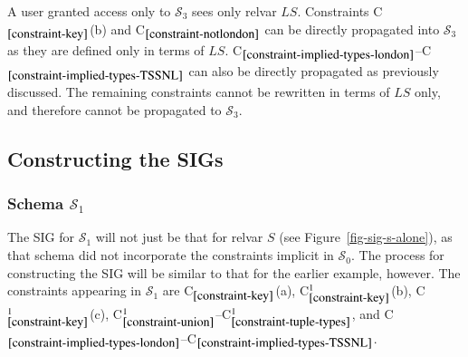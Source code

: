\documentclass{sig-alternate-05-2015}
\newcounter{constraint}
\newcommand{\LS}{\ensuremath{\mathit{LS}}}
\newcommand{\SC}[1]{\ensuremath{\mathcal{S}_{#1}}}
\begin{document}
\noindent A user granted access only to \(\SC{3}\) sees only relvar \(\LS\). Constraints C\(_{\ref{constraint-key}}\)(b) and C\(_{\ref{constraint-notlondon}}\) can be directly propagated into \(\SC{3}\) as they are defined only  in terms of \(\LS\). C\(_{\ref{constraint-implied-types-london}}\)--C\(_{\ref{constraint-implied-types-TSSNL}}\) can also be directly propagated as previously discussed. The remaining constraints cannot be rewritten in terms of \(\LS\) only, and therefore cannot be propagated to \(\SC{3}\).



\subsection{Constructing the SIGs}
\label{sec-date-sigs}




\subsubsection{Schema \(\SC{1}\)}
\label{sec-sigs-s-i}

\noindent The SIG for \(\SC{1}\) will not just be that for relvar \(S\!\) (see Figure~\ref{fig-sig-s-alone}), as that schema did not incorporate the constraints implicit in \(\SC{0}\). The process for constructing the SIG will be similar to that for the earlier example, however. The constraints appearing in \(\SC{1}\) are C\(_{\ref{constraint-key}}\)(a), C\(_{\ref{constraint-key}}^{1}\)(b), C\(_{\ref{constraint-key}}^{1}\)(c), C\(_{\ref{constraint-union}}^{1}\)--C\(_{\ref{constraint-tuple-types}}^{1}\), and C\(_{\ref{constraint-implied-types-london}}\)--C\(_{\ref{constraint-implied-types-TSSNL}}\).
\end{document}
